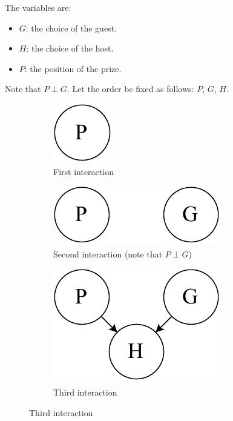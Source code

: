 \begin{example}
    The variables are:
    \begin{itemize}
        \item $G$: the choice of the guest.
        \item $H$: the choice of the host.
        \item $P$: the position of the prize.
    \end{itemize}
    Note that $P \perp G$.
    Let the order be fixed as follows: $P$, $G$, $H$.

    \begin{figure}[H]
        \begin{subfigure}{.3\textwidth}
            \centering
            \includegraphics[width=0.15\linewidth]{img/_monty_hall1.pdf}
            \caption{First interaction}
        \end{subfigure}
        \begin{subfigure}{.3\textwidth}
            \centering
            \includegraphics[width=0.45\linewidth]{img/_monty_hall2.pdf}
            \caption{Second interaction (note that $P \perp G$)}
        \end{subfigure}
        \begin{subfigure}{.3\textwidth}
            \centering
            \includegraphics[width=0.45\linewidth]{img/_monty_hall3.pdf}
            \caption{Third interaction}
        \end{subfigure}
    \end{figure}
\end{example}

